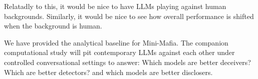 \documentclass{article}
\begin{document}
Relatadly to this, it would be nice to have LLMs playing against human backgrounds. Similarly, it would be nice to see how overall performance is shifted when the background is human. 


We have provided the analytical baseline for Mini-Mafia.  The companion computational study will pit contemporary LLMs against each other under controlled conversational settings to answer: Which models are better deceivers?  Which are better detectors? and which models are better disclosers.
\end{document}
